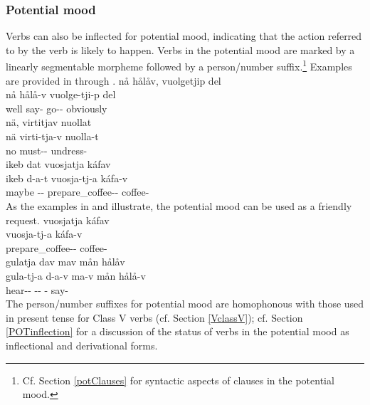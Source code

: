 \subsubsection{Potential mood}\label{POTmood}
Verbs can also be inflected for potential mood, indicating that the action referred to by the verb is likely to happen. Verbs in the potential mood are marked by a linearly segmentable morpheme  followed by a person/number suffix.\footnote{Cf. Section \ref{potClauses} for syntactic aspects of clauses in the potential mood.} 
Examples are provided in  through .
\ea\label{potentialEx1}
\glll	nå hålåv, vuolgetjip del\\
	nå hålå-v vuolge-tji-p del\\
	well say- go-- obviously\\\nopagebreak
{}	
\z
\ea\label{potentialEx2}
\glll	nä, virtitjav nuollat\\
	nä virti-tja-v nuolla-t\\
	no must-- undress-\\\nopagebreak
{}	
\z
\ea\label{potentialEx3}
\glll	ikeb dat vuosjatja káfav\\
	ikeb d-a-t vuosja-tj-a káfa-v\\
	maybe -- prepare\_coffee-- coffee-\\\nopagebreak
{}	
\z
As the examples in  and  illustrate, the potential mood can be used as a friendly request. 
\ea\label{potentialEx4}%
\glll	vuosjatja káfav\\
	vuosja-tj-a káfa-v\\
	prepare\_coffee-- coffee-\\\nopagebreak
{}	
\z
\ea\label{potentialEx5}%
\glll	gulatja dav mav mån hålåv\\
	gula-tj-a d-a-v ma-v mån hålå-v\\
	hear-- -- -  say-\\\nopagebreak
{}	
\z
The person/number suffixes for potential mood are homophonous %
with those used in present tense for Class V verbs (cf. Section \ref{VclassV}); cf. Section \ref{POTinflection} for a discussion of the status of verbs in the potential mood as inflectional and derivational forms. 


